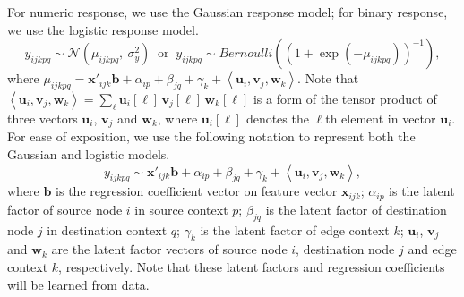 \documentclass[10pt]{article}
\newcommand{\parahead}[1]{\vspace{0.15in}\noindent{\bf #1:}}
\begin{document}
\parahead{Response model}
For numeric response, we use the Gaussian response model; for binary response, we use the logistic response model.
\begin{equation*}
y_{ijkpq} \sim \mathcal{N}(\mu_{ijkpq},~ \sigma^2_{y}) ~\textrm{ or }~
y_{ijkpq} \sim \textit{Bernoulli}((1 + \exp(-\mu_{ijkpq}))^{-1}),
\end{equation*}
where $\mu_{ijkpq} = \bm{x}'_{ijk} \bm{b} + \alpha_{ip} + \beta_{jq} + \gamma_{k} + \left<\bm{u}_i, \bm{v}_j, \bm{w}_k\right>$.  Note that $\left<\bm{u}_i, \bm{v}_j, \bm{w}_k\right> = \sum_{\ell} \bm{u}_i[\ell]\, \bm{v}_j[\ell]\, \bm{w}_k[\ell]$ is a form of the tensor product of three vectors $\bm{u}_i$, $\bm{v}_j$ and $\bm{w}_k$, where $\bm{u}_i[\ell]$ denotes the $\ell$th element in vector $\bm{u}_i$.
For ease of exposition, we use the following notation to represent both the Gaussian and logistic models.
$$
y_{ijkpq} \sim \bm{x}'_{ijk} \bm{b} + \alpha_{ip} + \beta_{jq} + \gamma_{k} + \left<\bm{u}_i, \bm{v}_j, \bm{w}_k\right>,
$$
where $\bm{b}$ is the regression coefficient vector on feature vector $\bm{x}_{ijk}$; $\alpha_{ip}$ is the latent factor of source node $i$ in source context $p$; $\beta_{jq}$ is the latent factor of destination node $j$ in destination context $q$; $\gamma_{k}$ is the latent factor of edge context $k$; $\bm{u}_i$, $\bm{v}_j$ and $\bm{w}_k$ are the latent factor vectors of source node $i$, destination node $j$ and edge context $k$, respectively.  Note that these latent factors and regression coefficients will be learned from data.





\end{document}
